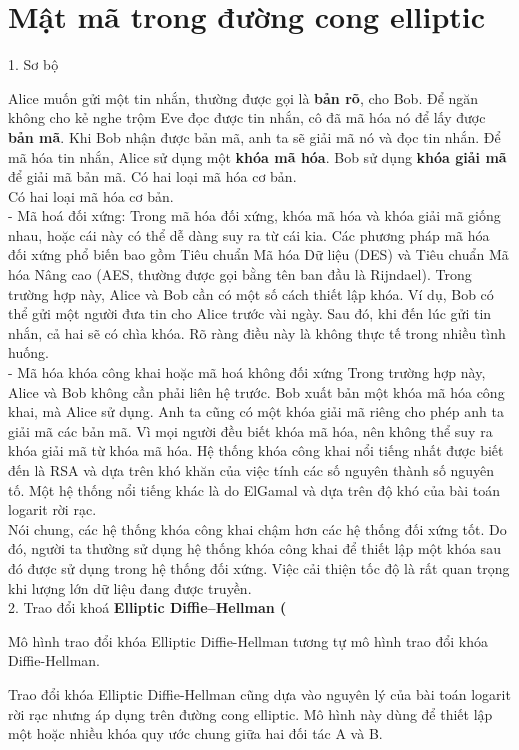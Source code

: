 \documentclass[13pt,a4paper,oneside,openany]{book}
\theoremstyle{definition}
\begin{document}
\section{Mật mã trong đường cong elliptic}
1. Sơ bộ

Alice muốn gửi một tin nhắn, thường được gọi là \textbf{bản rõ}, cho Bob. Để ngăn
không cho kẻ nghe trộm Eve đọc được tin nhắn, cô đã mã hóa nó để lấy
được \textbf{bản mã}. Khi Bob nhận được bản mã, anh ta sẽ giải mã nó và đọc tin
nhắn. Để mã hóa tin nhắn, Alice sử dụng một \textbf{khóa mã hóa}. Bob sử dụng
\textbf{khóa giải mã} để giải mã bản mã.
Có hai loại mã hóa cơ bản.\\
Có hai loại mã hóa cơ bản.\\
- Mã hoá đối xứng: Trong mã hóa đối xứng, khóa mã hóa và khóa giải mã
giống nhau, hoặc cái này có thể dễ dàng suy ra từ cái kia. Các phương
pháp mã hóa đối xứng phổ biến bao gồm Tiêu chuẩn Mã hóa Dữ liệu
(DES) và Tiêu chuẩn Mã hóa Nâng cao (AES, thường được gọi bằng tên
ban đầu là Rijndael). Trong trường hợp này, Alice và Bob cần có một số
cách thiết lập khóa. Ví dụ, Bob có thể gửi một người đưa tin cho Alice
trước vài ngày. Sau đó, khi đến lúc gửi tin nhắn, cả hai sẽ có chìa khóa.
Rõ ràng điều này là không thực tế trong nhiều tình huống.\\
- Mã hóa khóa công khai hoặc mã
hoá không đối xứng Trong trường hợp
này, Alice và Bob không cần phải liên hệ trước. Bob xuất bản một khóa
mã hóa công khai, mà Alice sử dụng. Anh ta cũng có một khóa giải mã
riêng cho phép anh ta giải mã các bản mã. Vì mọi người đều biết khóa
mã hóa, nên không thể suy ra khóa giải mã từ khóa mã hóa. Hệ thống
khóa công khai nổi tiếng nhất được biết đến là RSA và dựa trên khó khăn
của việc tính các số nguyên thành số nguyên tố. Một hệ thống nổi tiếng
khác là do ElGamal và dựa trên độ khó của bài toán logarit rời rạc.\\
Nói chung, các hệ thống khóa công khai chậm hơn các hệ thống đối xứng
tốt. Do đó, người ta thường sử dụng hệ thống khóa công khai để thiết lập
một khóa sau đó được sử dụng trong hệ thống đối xứng. Việc cải thiện tốc
độ là rất quan trọng khi lượng lớn dữ liệu đang được truyền.\\
2. Trao đổi khoá \textbf{Elliptic Diffie–Hellman (}

Mô hình trao đổi khóa Elliptic Diffie-Hellman tương tự mô hình trao đổi khóa
Diffie-Hellman.

Trao đổi khóa Elliptic Diffie-Hellman cũng dựa vào nguyên lý của bài toán
logarit rời rạc nhưng áp dụng trên đường cong elliptic. Mô hình này dùng để thiết
lập một hoặc nhiều khóa quy ước chung giữa hai đối tác A và B.
\end{document}
